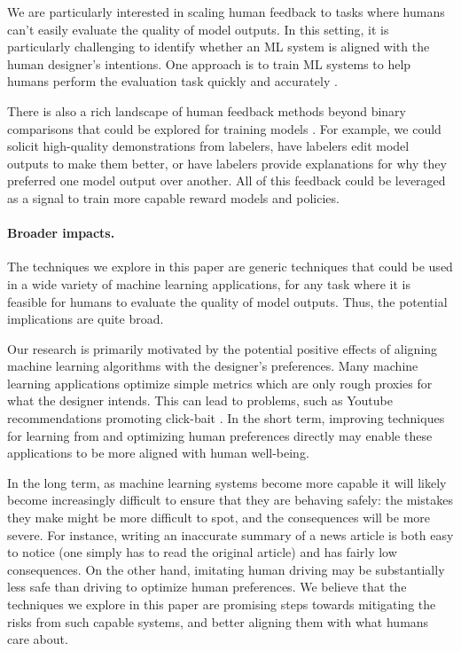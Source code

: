 We are particularly interested in scaling human feedback to tasks where humans can’t easily evaluate the quality of model outputs. In this setting, it is particularly challenging to identify whether an ML system is aligned with the human designer’s intentions. One approach is to train ML systems to help humans perform the evaluation task quickly and accurately \cite{christiano2018supervising}.

There is also a rich landscape of human feedback methods beyond binary comparisons that could be explored for training models \cite{unifying, fidler2017teaching, niu2018polite, welleck2019neural}. For example, we could solicit high-quality demonstrations from labelers, have labelers edit model outputs to make them better, or have labelers provide explanations for why they preferred one model output over another. All of this feedback could be leveraged as a signal to train more capable reward models and policies. 

\paragraph{Broader impacts.}

The techniques we explore in this paper are generic techniques that could be used in a wide variety of machine learning applications, for any task where it is feasible for humans to evaluate the quality of model outputs. Thus, the potential implications are quite broad.

Our research is primarily motivated by the potential positive effects of aligning machine learning algorithms with the designer's preferences. Many machine learning applications optimize simple metrics which are only rough proxies for what the designer intends. This can lead to problems, such as Youtube recommendations promoting click-bait \cite{covington2016deep}.  In the short term, improving techniques for learning from and optimizing human preferences directly may enable these applications to be more aligned with human well-being.

In the long term, as machine learning systems become more capable it will likely become increasingly difficult to ensure that they are behaving safely: the mistakes they make might be more difficult to spot, and the consequences will be more severe. For instance, writing an inaccurate summary of a news article is both easy to notice (one simply has to read the original article) and has fairly low consequences. On the other hand, imitating human driving may be substantially less safe than driving to optimize human preferences.  We believe that the techniques we explore in this paper are promising steps towards mitigating the risks from such capable systems, and better aligning them with what humans care about.  

